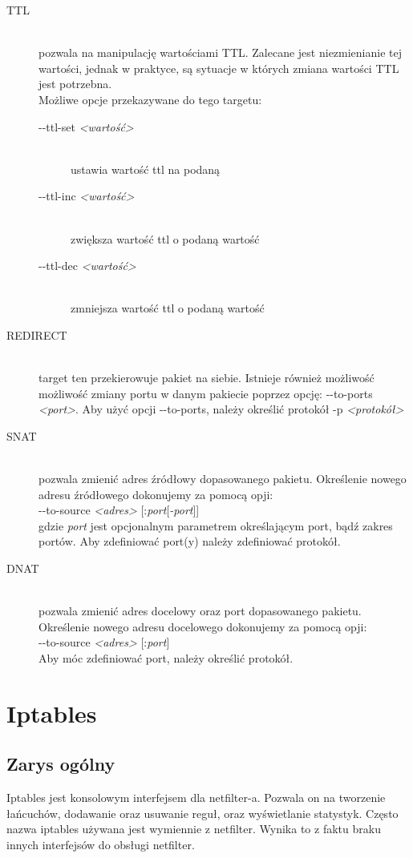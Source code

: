 \documentclass[a4paper,12pt]{book}
\newcommand{\param}[1]{\textit{\textless #1\textgreater}}
\begin{document}
\begin{description}
				\item[TTL] \hfill \\
					pozwala na manipulację wartościami TTL. Zalecane jest niezmienianie tej wartości, jednak w praktyce, są sytuacje w których zmiana wartości TTL jest potrzebna.\\
					Możliwe opcje przekazywane do tego targetu:
					\begin{description}
						\item[-{}-ttl-set \param{wartość}] \hfill \\
							ustawia wartość ttl na podaną
						\item[-{}-ttl-inc \param{wartość}] \hfill \\
							zwiększa wartość ttl o podaną wartość
						\item[-{}-ttl-dec \param{wartość}] \hfill \\
							zmniejsza wartość ttl o podaną wartość
					\end{description}
				\item[REDIRECT] \hfill \\
					target ten przekierowuje pakiet na siebie. Istnieje również możliwość możliwość zmiany portu w danym pakiecie poprzez opcję: -{}-to-ports \param{port}.
					Aby użyć opcji -{}-to-ports, należy określić protokół -p \param{protokół}
				\item[SNAT] \hfill \\
					pozwala zmienić adres źródłowy dopasowanego pakietu. Określenie nowego adresu źródłowego dokonujemy za pomocą opji:\\
					-{}-to-source \param{adres} [:\textit{port}[\textit{-port}]]\\
					gdzie \textit{port} jest opcjonalnym parametrem określającym port, bądź zakres portów. Aby zdefiniować port(y) należy zdefiniować protokół.
				\item[DNAT] \hfill \\
					pozwala zmienić adres docelowy oraz port dopasowanego pakietu. Określenie nowego adresu docelowego dokonujemy za pomocą opji:\\
					-{}-to-source \param{adres} [:\textit{port}]\\
					Aby móc zdefiniować port, należy określić protokół.
			\end{description}
\chapter{Iptables}
	\section{Zarys ogólny}
		Iptables jest konsolowym interfejsem dla netfilter-a. Pozwala on na tworzenie łańcuchów, dodawanie oraz usuwanie reguł, oraz wyświetlanie statystyk.
		Często nazwa iptables używana jest wymiennie z netfilter. Wynika to z faktu braku innych interfejsów do obsługi netfilter.
\end{document}
